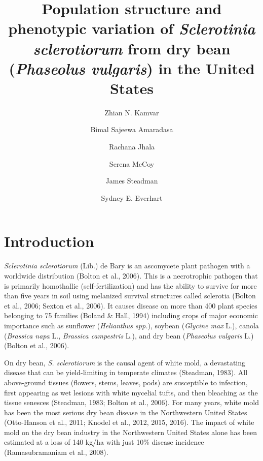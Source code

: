\documentclass[fleqn,10pt,lineno]{wlpeerj} %
\title{Population structure and phenotypic variation of \emph{Sclerotinia
sclerotiorum} from dry bean (\emph{Phaseolus vulgaris}) in the United
States}
\author[1]{Zhian N. Kamvar}
\author[1]{Bimal Sajeewa Amaradasa}
\author[1]{Rachana Jhala}
\author[1]{Serena McCoy}
\author[1]{James Steadman}
\author[1]{Sydney E. Everhart}
\affil[1]{Department of Plant Pathology, University of Nebraska-Lincoln, Lincoln,
NE 68583}
\theoremstyle{definition}
\theoremstyle{definition}
\theoremstyle{definition}
\theoremstyle{remark}
\begin{document}
\flushbottom
\maketitle
\thispagestyle{empty}

\section*{Introduction}\label{introduction}

\emph{Sclerotinia sclerotiorum} (Lib.) de Bary is an ascomycete plant
pathogen with a worldwide distribution (Bolton et al., 2006). This is a
necrotrophic pathogen that is primarily homothallic (self-fertilization)
and has the ability to survive for more than five years in soil using
melanized survival structures called sclerotia (Bolton et al., 2006;
Sexton et al., 2006). It causes disease on more than 400 plant species
belonging to 75 families (Boland \& Hall, 1994) including crops of major
economic importance such as sunflower (\emph{Helianthus spp.}), soybean
(\emph{Glycine max} L.), canola (\emph{Brassica napa} L., \emph{Brassica
campestris} L.), and dry bean (\emph{Phaseolus vulgaris} L.) (Bolton et
al., 2006).

On dry bean, \emph{S. sclerotiorum} is the causal agent of white mold, a
devastating disease that can be yield-limiting in temperate climates
(Steadman, 1983). All above-ground tissues (flowers, stems, leaves,
pods) are susceptible to infection, first appearing as wet lesions with
white mycelial tufts, and then bleaching as the tissue senesces
(Steadman, 1983; Bolton et al., 2006). For many years, white mold has
been the most serious dry bean disease in the Northwestern United States
(Otto-Hanson et al., 2011; Knodel et al., 2012, 2015, 2016). The impact
of white mold on the dry bean industry in the Northwestern United States
alone has been estimated at a loss of 140 kg/ha with just 10\% disease
incidence (Ramasubramaniam et al., 2008).
\end{document}
